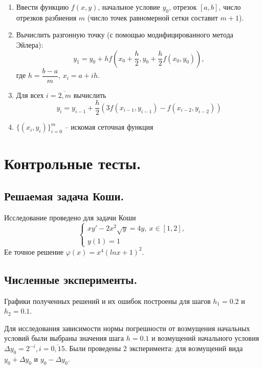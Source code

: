 \documentclass[a4paper, 12pt]{article}
\begin{document}
	\begin{enumerate}
		\item Ввести функцию $f(x,y)$, начальное условие $y_0$, отрезок $[a,b]$, число отрезков разбиения $m$ (число точек равномерной сетки составит $m+1$).
		\item Вычислить разгонную точку (с помощью модифицированного метода Эйлера):
		\begin{equation} \label{euler_boost}
			y_1 = y_0 + hf(x_0 + \frac{h}{2}, y_0+\frac{h}{2}f(x_0,y_0)),
		\end{equation}
		где $h=\dfrac{b-a}{m}$, $x_i=a+ih$.
		\item Для всех $i=\overline{2,m}$ вычислить
		\begin{equation} \label{adams_method}
			y_i = y_{i-1} + \frac{h}{2}(3f(x_{i-1},y_{i-1})-f(x_{i-2}, y_{i-2}))
		\end{equation}
		\item $\{(x_i,y_i)\}_{i=0}^m$ -- искомая сеточная функция
	\end{enumerate}
	
	\section{Контрольные тесты.}
	
	\subsection{Решаемая задача Коши.}
	
	Исследование проведено для задачи Коши
	\begin{equation} \label{mytask}
		\begin{cases}
			xy'-2x^2\sqrt{y}=4y,\ x\in[1,2],\\
			y(1)=1
		\end{cases}
	\end{equation}
	Ее точное решение $\varphi(x)=x^4(lnx+1)^2$.
	
	\subsection{Численные эксперименты.}
	
	Графики полученных решений и их ошибок построены для шагов $h_1=0.2$ и $h_2=0.1$.
	
	Для исследования зависимости нормы погрешности от возмущения начальных условий были выбраны значения шага $h=0.1$ и возмущений начального условия $\Delta y_0=2^{-i}, i=\overline{0,15}$. Были проведены 2 эксперимента: для возмущений вида $y_0+\Delta y_0$ и $y_0-\Delta y_0$. 
	
\end{document}
